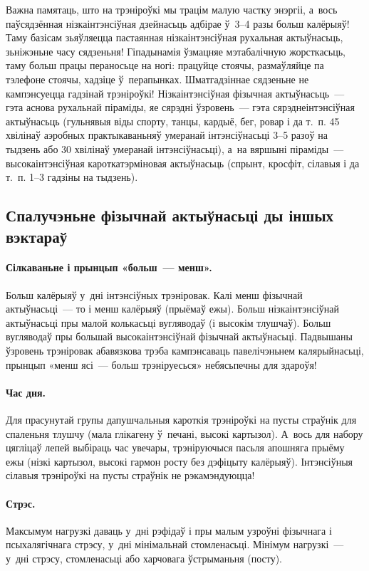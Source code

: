 Важна памятаць, што на трэніроўкі мы трацім малую частку энэргіі, а~вось паўсядзённая нізкаінтэнсіўная дзейнасьць адбірае ў~3--4 разы больш калёрыяў! Таму базісам зьяўляецца пастаянная нізкаінтэнсіўная рухальная актыўнасьць, зьніжэньне часу сядзеньня! Гіпадынамія ўзмацняе мэтабалічную жорсткасьць, таму больш працы пераносьце на ногі: працуйце стоячы, размаўляйце па тэлефоне стоячы, хадзіце ў~перапынках. Шматгадзіннае сядзеньне не кампэнсуецца гадзінай трэніроўкі! Нізкаінтэнсіўная фізычная актыўнасьць~--- гэта аснова рухальнай піраміды, яе сярэдні ўзровень~--- гэта сярэднеінтэнсіўная актыўнасьць (гульнявыя віды спорту, танцы, кардыё, бег, ровар і да т.~п. 45 хвілінаў аэробных практыкаваньняў умеранай інтэнсіўнасьці 3--5 разоў на тыдзень або 30 хвілінаў умеранай інтэнсіўнасьці), а~на вяршыні піраміды~--- высокаінтэнсіўная кароткатэрміновая актыўнасьць (спрынт, кросфіт, сілавыя і да т.~п. 1--3 гадзіны на тыдзень).

\subsection{Спалучэньне фізычнай актыўнасьці ды іншых вэктараў}

\paragraph{Сілкаваньне і прынцып «больш~--- менш».}
Больш калёрыяў у~дні інтэнсіўных трэніровак. Калі менш фізычнай актыўнасьці~--- то і менш калёрыяў (прыёмаў ежы). Больш нізкаінтэнсіўнай актыўнасьці пры малой колькасьці вугляводаў (і высокім тлушчаў). Больш вугляводаў пры большай высокаінтэнсіўнай фізычнай актыўнасьці. Падвышаны ўзровень трэніровак абавязкова трэба кампэнсаваць павелічэньнем калярыйнасьці, прынцып «менш ясі~--- больш трэніруесься» небясьпечны для здароўя!

\paragraph{Час дня.}
Для прасунутай групы дапушчальныя кароткія трэніроўкі на пусты страўнік для спаленьня тлушчу (мала глікагену ў~печані, высокі картызол). А~вось для набору цягліцаў лепей выбіраць час увечары, трэніруючыся пасьля апошняга прыёму ежы (нізкі картызол, высокі гармон росту без дэфіцыту калёрыяў). Інтэнсіўныя сілавыя трэніроўкі на пусты страўнік не рэкамэндуюцца!

\paragraph{Стрэс.}
Максымум нагрузкі даваць у~дні рэфідаў і пры малым узроўні фізычнага і псыхалягічнага стрэсу, у~дні мінімальнай стомленасьці. Мінімум нагрузкі~--- у~дні стрэсу, стомленасьці або харчовага ўстрыманьня (посту).

